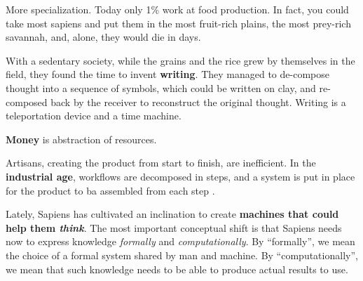 More specialization.
Today only 1\% work at food production.
In fact, you could take most sapiens and put them in the most fruit-rich plains, the most prey-rich savannah, and, alone, they would die in days.


With a sedentary society, while the grains and the rice grew by themselves in the field, they found the time to invent \textbf{writing}.
They managed to de-compose thought into a sequence of symbols, which could be written on clay, and re-composed back by the receiver to reconstruct the original thought.
Writing is a teleportation device and a time machine.

\textbf{Money} is abstraction of resources.

Artisans, creating the product from start to finish, are inefficient.
In the \textbf{industrial age}, workflows are decomposed in steps, and a system is put in place for the product to ba assembled from each step .

Lately, Sapiens has cultivated an inclination to create \textbf{machines that could help them \emph{think}}.
The most important conceptual shift is that Sapiens needs now to express knowledge \emph{formally} and \emph{computationally}.
By ``formally'', we mean the choice of a formal system shared by man and machine.
By ``computationally'', we mean that such knowledge needs to be able to produce actual results to use.






%
%

